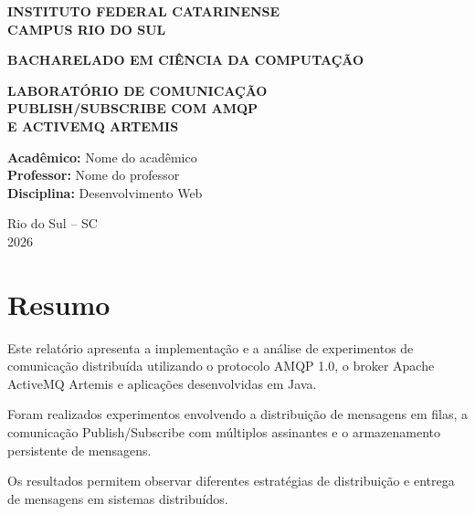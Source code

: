 \documentclass[12pt,a4paper]{article}
\begin{document}
\begin{titlepage}
    \begin{center}

        \textbf{INSTITUTO FEDERAL CATARINENSE}\\
        \textbf{CAMPUS RIO DO SUL}

        \vspace{2cm}

        \textbf{BACHARELADO EM CIÊNCIA DA COMPUTAÇÃO}

        \vspace{3cm}

        {\Large\bfseries
        LABORATÓRIO DE COMUNICAÇÃO\\
        PUBLISH/SUBSCRIBE COM AMQP\\
        E ACTIVEMQ ARTEMIS
        }

        \vspace{3cm}

        \textbf{Acadêmico:} Nome do acadêmico\\
        \textbf{Professor:} Nome do professor\\
        \textbf{Disciplina:} Desenvolvimento Web

        \vfill

        Rio do Sul -- SC\\
        2026

    \end{center}
\end{titlepage}

\section*{Resumo}

Este relatório apresenta a implementação e a análise
de experimentos de comunicação distribuída utilizando
o protocolo AMQP 1.0, o broker Apache ActiveMQ Artemis
e aplicações desenvolvidas em Java.

Foram realizados experimentos envolvendo a distribuição
de mensagens em filas, a comunicação Publish/Subscribe
com múltiplos assinantes e o armazenamento persistente
de mensagens.

Os resultados permitem observar diferentes estratégias
de distribuição e entrega de mensagens em sistemas
distribuídos.
\end{document}

